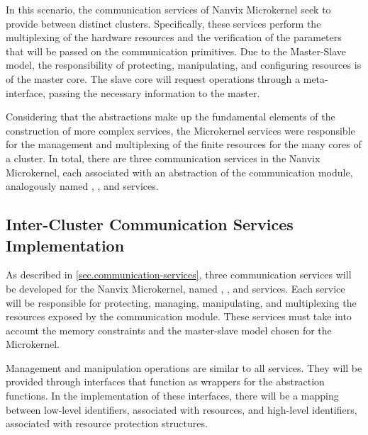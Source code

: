 			In this scenario, the communication services of Nanvix Microkernel seek
			to provide \ipc between distinct clusters.
			Specifically, these services perform the multiplexing of the hardware
			resources and the verification of the parameters that will be passed
			on the communication primitives.
			Due to the Master-Slave model, the responsibility of protecting,
			manipulating, and configuring \hal resources is of the master core.
			The slave core will request operations through a meta-interface,
			passing the necessary information to the master.

			Considering that the abstractions make up the fundamental elements of
			the construction of more complex services, the Microkernel services
			were responsible for the management and multiplexing of the finite
			resources for the many cores of a cluster.
			In total, there are three communication services in the Nanvix Microkernel,
			each associated with an abstraction of the communication module,
			analogously named \sync, \mailbox, and \portal services.

		\subsection{Inter-Cluster Communication Services Implementation}


			As described in \autoref{sec.communication-services}, three communication
			services will be developed for the Nanvix Microkernel, named \sync, \mailbox,
			and \portal services.
			Each service will be responsible for protecting, managing, manipulating,
			and multiplexing the resources exposed by the \hal communication module.
			These services must take into account the memory constraints and the
			master-slave model chosen for the Microkernel.

			Management and manipulation operations are similar to all services.
			They will be provided through interfaces that function as wrappers
			for the \hal abstraction functions.
			In the implementation of these interfaces, there will be a mapping
			between low-level identifiers, associated with \hal resources,
			and high-level identifiers, associated with resource protection structures.


